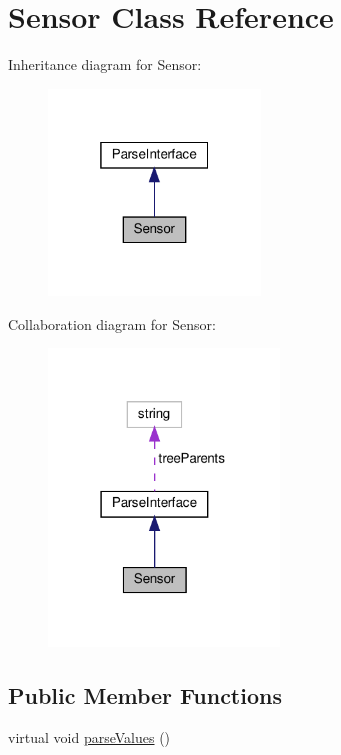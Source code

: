\hypertarget{classSensor}{}\section{Sensor Class Reference}
\label{classSensor}


Inheritance diagram for Sensor\+:
\nopagebreak
\begin{figure}[H]
\begin{center}
\leavevmode
\includegraphics[width=160pt]{classSensor__inherit__graph}
\end{center}
\end{figure}


Collaboration diagram for Sensor\+:
\nopagebreak
\begin{figure}[H]
\begin{center}
\leavevmode
\includegraphics[width=174pt]{classSensor__coll__graph}
\end{center}
\end{figure}
\subsection*{Public Member Functions}
\begin{DoxyCompactItemize}
\item 
virtual void \hyperlink{classSensor_a570a911466a9fd98894f7c2f2abaf103}{parse\+Values} ()
\end{DoxyCompactItemize}

